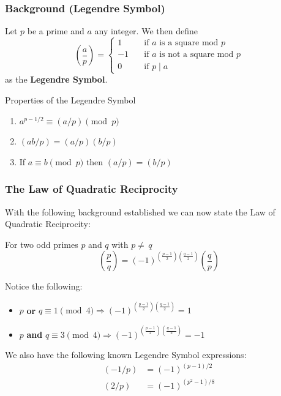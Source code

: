 \documentclass{beamer}
\begin{document}
\begin{frame}
    \frametitle{Background (Legendre Symbol)}
    \begin{definition}
       Let $p$ be a prime and $a$ any integer. We then define 
       \[
            \left(\frac{a}{p}\right) = \begin{cases}
                1 \quad &\text{if $a$ is a square mod $p$} \\
                -1 \quad &\text{if $a$ is not a square mod $p$} \\
                0 \quad &\text{if $p\mid a$}
            \end{cases}
       \] 
       as the \textbf{Legendre Symbol}.
    \end{definition}
    \begin{alertblock}{Properties of the Legendre Symbol}
        \begin{enumerate}
            \item $a^{p-1/2} \equiv (a/p) \pmod{p}$
            \item $(ab/p) = (a/p)(b/p)$
            \item If $a \equiv b \pmod{p}$ then $(a/p) = (b/p)$
        \end{enumerate}    
    \end{alertblock}
\end{frame}

\begin{frame}
    \frametitle{The Law of Quadratic Reciprocity}
    With the following background established we can now state the Law of Quadratic Reciprocity:
    \begin{theorem}
        For two odd primes $p$ and $q$ with $p\neq\,q$
        \[
            \left(\frac{p}{q}\right) = \left(-1\right)^{\left(\frac{p-1}{2}\right)\left(\frac{q-1}{2}\right)}\left(\frac{q}{p}\right)
        \]
    \end{theorem}
    Notice the following: 
    \begin{itemize}
        \item $p$ \textbf{or} $q \equiv 1 \pmod{4} \Rightarrow \left(-1\right)^{\left(\frac{p-1}{2}\right)\left(\frac{q-1}{2}\right)} = 1$ 
        \item $p$ \textbf{and} $q \equiv 3 \pmod{4} \Rightarrow \left(-1\right)^{\left(\frac{p-1}{2}\right)\left(\frac{q-1}{2}\right)} = -1$ 
    \end{itemize}
    We also have the following known Legendre Symbol expressions:
    \begin{align*}
        (-1/p) &= (-1)^{(p-1)/2} \\
        (2/p) &= (-1)^{(p^2-1)/8}
    \end{align*}
\end{frame}
\end{document}
